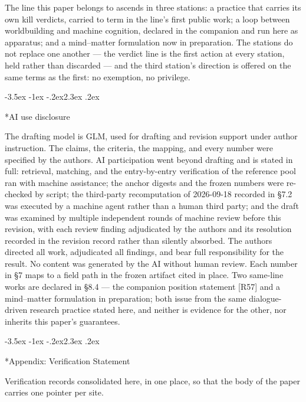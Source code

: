 \documentclass[11pt,a4paper]{article}
\makeatletter
\renewcommand\section{\@startsection{section}{1}{\z@}%
  {-3.5ex \@plus -1ex \@minus -.2ex}{2.3ex \@plus .2ex}%
  {\normalfont\Large\bfseries\raggedright}}
\makeatother
\begin{document}
The line this paper belongs to ascends in three stations: a practice that carries its own kill verdicts, carried to term in the line's first public work; a loop between worldbuilding and machine cognition, declared in the companion and run here as apparatus; and a mind–matter formulation now in preparation. The stations do not replace one another — the verdict line is the first action at every station, held rather than discarded — and the third station's direction is offered on the same terms as the first: no exemption, no privilege.

\section*{AI use disclosure}

The drafting model is GLM, used for drafting and revision support under author instruction. The claims, the criteria, the mapping, and every number were specified by the authors. AI participation went beyond drafting and is stated in full: retrieval, matching, and the entry-by-entry verification of the reference pool ran with machine assistance; the anchor digests and the frozen numbers were re-checked by script; the third-party recomputation of 2026-09-18 recorded in §7.2 was executed by a machine agent rather than a human third party; and the draft was examined by multiple independent rounds of machine review before this revision, with each review finding adjudicated by the authors and its resolution recorded in the revision record rather than silently absorbed. The authors directed all work, adjudicated all findings, and bear full responsibility for the result. No content was generated by the AI without human review. Each number in §7 maps to a field path in the frozen artifact cited in place. Two same-line works are declared in §8.4 — the companion position statement [R57] and a mind--matter formulation in preparation; both issue from the same dialogue-driven research practice stated here, and neither is evidence for the other, nor inherits this paper's guarantees.

\section*{Appendix: Verification Statement}

Verification records consolidated here, in one place, so that the body of the paper carries one pointer per site.
\end{document}

